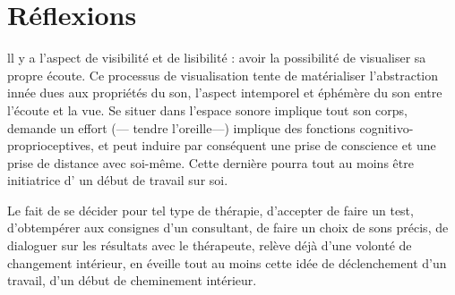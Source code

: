 
\chapter{Réflexions}

ll y a l'aspect de visibilité et de lisibilité : avoir  la possibilité de visualiser sa propre écoute. Ce processus de visualisation tente de matérialiser l'abstraction innée dues aux propriétés du son, l'aspect intemporel et éphémère du son entre l'écoute et la vue. Se situer dans l'espace sonore implique tout son corps, demande un effort (--- tendre l'oreille---) implique des fonctions cognitivo-proprioceptives, et peut induire par conséquent  une prise de conscience et une prise de distance avec soi-même. Cette dernière pourra tout au  moins être initiatrice d' un début de travail sur soi.  

Le fait de se décider pour tel type de thérapie, d'accepter de faire un test, d'obtempérer aux consignes d'un consultant, de faire un choix de sons précis, de dialoguer sur les résultats avec le thérapeute, relève déjà d'une volonté de changement intérieur, en  éveille tout au moins cette idée de déclenchement d'un travail, d'un début de cheminement intérieur.

